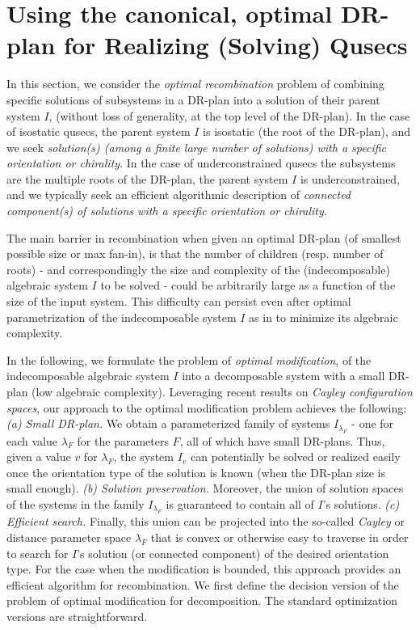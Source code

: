 \section{Using the canonical, optimal DR-plan for Realizing (Solving) Qusecs}
\label{sec:recomb}

In this section, we consider the {\em optimal recombination}
problem of combining specific solutions of
subsystems in a DR-plan into a solution of their parent system $I$, (without
loss of generality, at the top level of the DR-plan). In the case of isostatic
qusecs, the parent system $I$ is isostatic (the root of the DR-plan), and we
seek  {\em solution(s) (among a finite large number of solutions)
with a specific orientation or chirality}.
In the case of underconstrained qusecs the subsystems are the multiple roots
of the DR-plan, the parent system $I$ is underconstrained, and we typically seek
an efficient algorithmic description of {\em connected component(s) of solutions with a specific orientation or
chirality}.

The main barrier in recombination when given an optimal DR-plan (of smallest possible
size or max fan-in),  is that the number of children (resp. number of
roots) - and correspondingly the  size and complexity of the (indecomposable) algebraic
system $I$ to be solved -
could be arbitrarily large as a function of the size of the input system.
This difficulty can persist even after optimal parametrization of the
indecomposable system $I$ as in \cite{XX}
to minimize its algebraic complexity.

In the following, we formulate the problem of {\em optimal
modification},
of the indecomposable
algebraic system $I$ into a decomposable system with a small DR-plan (low
algebraic complexity).
Leveraging recent results on {\em Cayley
configuration spaces}, our approach to the optimal modification problem
achieves the following: {\em (a) Small DR-plan.} We obtain a  parameterized family of systems
$I_{\lambda_F}$ -  one for each value $\lambda_F$ for the parameters $F$,  all of which have
small DR-plans. Thus, given a value $v$ for $\lambda_F$, the system $I_v$ can
potentially be solved or realized easily once the orientation type of the solution
is known  (when the DR-plan size is small enough).
{\em (b) Solution preservation.} Moreover, the union of solution spaces of the systems in the family
$I_{\lambda_F}$
is guaranteed to contain
all of $I$'s solutions. {\em (c) Efficient search.} Finally, this union can be projected into the
so-called {\em Cayley} or distance parameter space $\lambda_F$ that is convex
or otherwise easy to traverse in order to search for $I$'s solution
(or connected component)
of the desired orientation type.
For the case when the modification is bounded, this approach provides an efficient
algorithm for recombination. We first define the decision version of the
problem of optimal modification
for decomposition. The standard optimization versions are straightforward.

